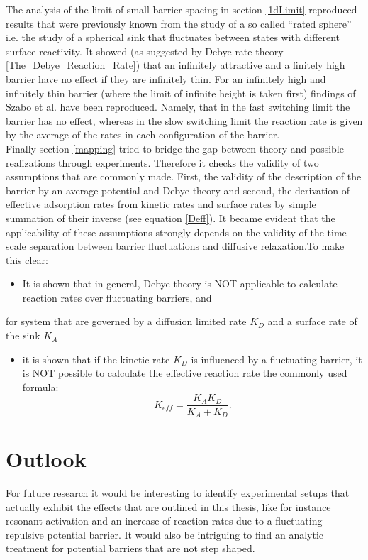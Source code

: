 The analysis of the limit of small barrier spacing in section \ref{1dLimit} reproduced results that were previously known from the study of a so called ``rated sphere'' i.e. the study of a spherical sink that fluctuates between states with different surface reactivity. It showed (as suggested by Debye rate theory \ref{The_Debye_Reaction_Rate}) that an infinitely attractive and a finitely high barrier have no effect if they are infinitely thin. For an infinitely high and infinitely thin barrier (where the limit of infinite height is taken first) findings of Szabo et al. \cite{Szabo1982} have been reproduced. Namely, that in the fast switching limit the barrier has no effect, whereas in the slow switching limit the reaction rate is given by the average of the rates in each configuration of the barrier. \\
Finally section \ref{mapping} tried to bridge the gap between theory and possible realizations through experiments. Therefore it checks the validity of two assumptions that are commonly made. First, the validity of the description of the barrier by an average potential and Debye theory and second, the derivation of effective adsorption rates from kinetic rates and surface rates by simple summation of their inverse (see equation \eqref{Deff}). It became evident that the applicability of these assumptions strongly depends on the validity of the time scale separation between barrier fluctuations and diffusive relaxation.To make this clear:
\begin{itemize}
    \item It is shown that in general, Debye theory is NOT applicable to calculate reaction rates over fluctuating barriers, and
\end{itemize}
for system that are governed by a diffusion limited rate $K_D$ and a surface rate of the sink $K_A$
\begin{itemize}
    \item it is shown that if the kinetic rate $K_D$ is influenced by a fluctuating barrier, it is NOT possible to calculate the effective reaction rate the commonly used formula:
        \begin{equation}
            K_{eff} = \frac{K_A K_D}{K_A + K_D}. \nonumber
        \end{equation}
\end{itemize}
\section{Outlook}
For future research it would be interesting to identify experimental setups that actually exhibit the effects that are outlined in this thesis, like for instance resonant activation and an increase of reaction rates due to a fluctuating repulsive potential barrier. It would also be intriguing to find an analytic treatment for potential barriers that are not step shaped. 
